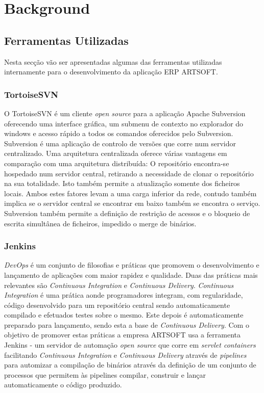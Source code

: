 \documentclass[sigplan]{acmart}
\begin{document}
\section{Background} \label{sec:background}

\subsection{Ferramentas Utilizadas}

Nesta secção vão ser apresentadas algumas das ferramentas utilizadas internamente para o desenvolvimento da aplicação ERP ARTSOFT.

\subsubsection{TortoiseSVN}

O TortoiseSVN é um cliente \textit{open source} para a aplicação Apache Subversion oferecendo uma interface gráfica, um submenu de contexto no explorador do windows e acesso rápido a todos os comandos oferecidos pelo Subversion. Subversion é uma aplicação de controlo de versões que corre num servidor centralizado. Uma arquitetura centralizada oferece várias vantagens em comparação com uma arquitetura distribuída: O repositório encontra-se hospedado num servidor central, retirando a necessidade de clonar o repositório na sua totalidade. Isto também permite a atualização somente dos ficheiros locais. Ambos estes fatores levam a uma carga inferior da rede, contudo também implica se o servidor central se encontrar em baixo também se encontra o serviço. Subversion também permite a definição de restrição de acessos e o bloqueio de escrita simultânea de ficheiros, impedido o merge de binários.

\subsubsection{Jenkins}

\textit{DevOps} é um conjunto de filosofias e práticas que promovem o desenvolvimento e lançamento de aplicações com maior rapidez e qualidade. Duas das práticas mais relevantes são \textit{Continuous Integration} e \textit{Continuous Delivery}. \textit{Continuous Integration} é uma prática aonde programadores integram, com regularidade, código desenvolvido para um repositório central sendo automaticamente compilado e efetuados testes sobre o mesmo. Este depois é automaticamente preparado para lançamento, sendo esta a base de \textit{Continuous Delivery}. Com o objetivo de promover estas práticas a empresa ARTSOFT usa a ferramenta Jenkins - um servidor de automação \textit{open source} que corre em \textit{servlet containers} facilitando \textit{Continuous Integration} e \textit{Continuous Delivery} através de \textit{pipelines} para automizar a compilação de binários através da definição de um conjunto de processos que permitem às pipelines compilar, construir e lançar automaticamente o código produzido.
\end{document}
